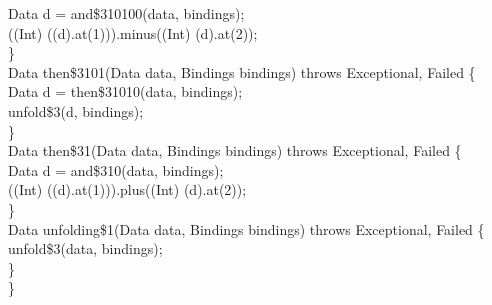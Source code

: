 \begin{flushleft}
\hspace*{8\indentation}Data d = and\$310100(data, bindings);\mbox{}\\
\hspace*{8\indentation}{\bf return} ((Int) ((d).at(1))).minus((Int) (d).at(2));\mbox{}\\
\hspace*{4\indentation}\}\mbox{}\\
\hspace*{4\indentation}{\bf private} Data then\$3101(Data data, Bindings bindings) throws Exceptional, Failed \{\mbox{}\\
\hspace*{8\indentation}Data d = then\$31010(data, bindings);\mbox{}\\
\hspace*{8\indentation}{\bf return} unfold\$3(d, bindings);\mbox{}\\
\hspace*{4\indentation}\}\mbox{}\\
\hspace*{4\indentation}{\bf private} Data then\$31(Data data, Bindings bindings) throws Exceptional, Failed \{\mbox{}\\
\hspace*{8\indentation}Data d = and\$310(data, bindings);\mbox{}\\
\hspace*{8\indentation}{\bf return} ((Int) ((d).at(1))).plus((Int) (d).at(2));\mbox{}\\
\hspace*{4\indentation}\}\mbox{}\\
\hspace*{4\indentation}{\bf private} Data unfolding\$1(Data data, Bindings bindings) throws Exceptional, Failed \{\mbox{}\\
\hspace*{8\indentation}{\bf return} unfold\$3(data, bindings);\mbox{}\\
\hspace*{4\indentation}\}\mbox{}\\
\}\mbox{}\\
\end{flushleft}
